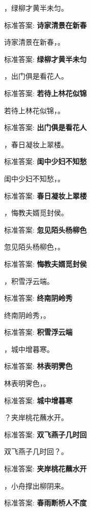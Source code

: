 \documentclass[12pt, a4paper, addpoints]{exam}
\begin{document}
\begin{questions}
\question[1] \uline{\qquad\qquad\qquad}，绿柳才黄半未匀。

标准答案: \textbf{诗家清景在新春}

\question[1] 诗家清景在新春，\uline{\qquad\qquad\qquad}。

标准答案: \textbf{绿柳才黄半未匀}

\question[1] \uline{\qquad\qquad\qquad}，出门俱是看花人。

标准答案: \textbf{若待上林花似锦}

\question[1] 若待上林花似锦，\uline{\qquad\qquad\qquad}。

标准答案: \textbf{出门俱是看花人}

\question[1] \uline{\qquad\qquad\qquad}，春日凝妆上翠楼。

标准答案: \textbf{闺中少妇不知愁}

\question[1] 闺中少妇不知愁，\uline{\qquad\qquad\qquad}。

标准答案: \textbf{春日凝妆上翠楼}

\question[1] \uline{\qquad\qquad\qquad}，悔教夫婿觅封侯。

标准答案: \textbf{忽见陌头杨柳色}

\question[1] 忽见陌头杨柳色，\uline{\qquad\qquad\qquad}。

标准答案: \textbf{悔教夫婿觅封侯}

\question[1] \uline{\qquad\qquad\qquad}，积雪浮云端。

标准答案: \textbf{终南阴岭秀}

\question[1] 终南阴岭秀，\uline{\qquad\qquad\qquad}。

标准答案: \textbf{积雪浮云端}

\question[1] \uline{\qquad\qquad\qquad}，城中增暮寒。

标准答案: \textbf{林表明霁色}

\question[1] 林表明霁色，\uline{\qquad\qquad\qquad}。

标准答案: \textbf{城中增暮寒}

\question[1] \uline{\qquad\qquad\qquad}？夹岸桃花蘸水开。

标准答案: \textbf{双飞燕子几时回}

\question[1] 双飞燕子几时回？\uline{\qquad\qquad\qquad}。

标准答案: \textbf{夹岸桃花蘸水开}

\question[1] \uline{\qquad\qquad\qquad}，小舟撑出柳阴来。

标准答案: \textbf{春雨断桥人不度}


\end{questions}
\end{document}
